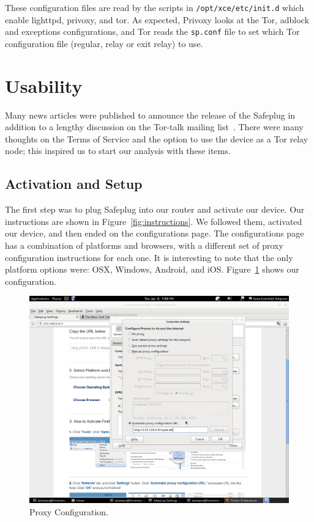 \documentclass[conference]{IEEEtran}
\begin{document}
These configuration files are read by the scripts in \verb!/opt/xce/etc/init.d! which enable lighttpd, privoxy, and tor.  As expected, Privoxy looks at the Tor, adblock and exceptions configurations, and Tor reads the \verb!sp.conf! file to set which Tor configuration file (regular, relay or exit relay) to use.

\section{Usability}
Many news articles were published to announce the release of the Safeplug in addition to a lengthy discussion on the Tor-talk mailing list~\cite{tormailinglist}.  There were many thoughts on the Terms of Service and the option to use the device as a Tor relay node; this inspired us to start our analysis with these items.  

\subsection{Activation and Setup}
The first step was to plug Safeplug into our router and activate our device.  Our instructions are shown in Figure~\ref{fig:instructions}.  We followed them, activated our device, and then ended on the configurations page.  The configurations page has a combination of platforms and browsers, with a different set of proxy configuration instructions for each one.  It is interesting to note that the only platform options were: OSX, Windows, Android, and iOS.  Figure~\ref{fig:proxyconfig} shows our configuration. 

\begin{figure}[t]
\begin{center}
\includegraphics[width=.75\textwidth]{proxyconfig}
\caption{Proxy Configuration.}
\label{fig:proxyconfig}
\end{center}
\end{figure}
\end{document}
